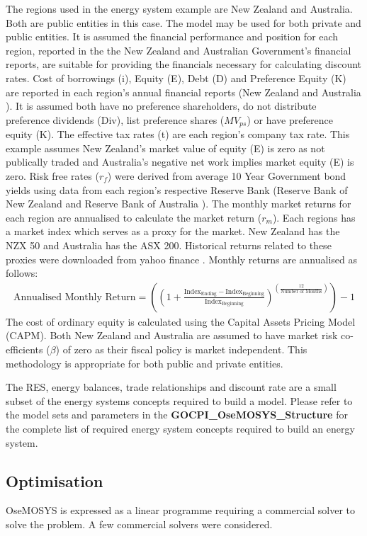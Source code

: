 \documentclass[12pt]{article}
\begin{document}
The regions used in the energy system example are New Zealand and Australia. 
Both are public entities in this case.
The model may be used for both private and public entities.
It is assumed the financial performance and position for each region, reported in the the New Zealand and Australian Government's financial reports, are suitable for providing the financials necessary for calculating discount rates.
Cost of borrowings (i), Equity (E),  Debt (D) and Preference Equity (K) 
are reported in each region's annual financial reports (New Zealand \cite{TNZ_FR} and Australia \cite{AG_FR}).
It is assumed both have no preference shareholders, do not distribute preference dividends (Div), list preference shares ($MV_{ps}$) or have preference equity (K).
The effective tax rates (t) are each region's company tax rate. 
This example assumes New Zealand's market value of equity (E) is zero as not publically traded and Australia's negative net work implies market equity (E) is zero.
Risk free rates ($r_f$) were derived from average 10 Year Government bond yields using data from each region's respective 
Reserve Bank (Reserve Bank of New Zealand \cite{RBNZ_WIR} and Reserve Bank of Australia \cite{RBA_ZCL}). 
The monthly market returns for each region are annualised to calculate the market return ($r_m$). 
Each regions has a market index which serves as a proxy for the market. 
New Zealand has the NZX 50 and Australia has the ASX 200. Historical returns related to these proxies were downloaded from yahoo finance \cite{ASX_NZ}.
Monthly returns are annualised as follows: 
\begin{align}
	\text{Annualised Monthly Return} = ((1 + \frac{\text{Index}_{\text{Ending}}-\text{Index}_{\text{Beginning}}}{\text{Index}_{\text{Beginning}}})^{(\frac{12}{\text{Number of Months}})})-1
\end{align}
The cost of ordinary equity is calculated using the Capital Assets Pricing Model (CAPM). 
Both New Zealand and Australia are assumed to have market risk co-efficients ($\beta$) of zero as their fiscal policy is market independent.
This methodology is appropriate for both public and private entities.

The RES, energy balances, trade relationships and discount rate are a small subset of the energy systems concepts required to build a model.
Please refer to the model sets and parameters in the \textbf{GOCPI\_OseMOSYS\_Structure} for the complete list of required energy system concepts required to build an energy system.

\subsection{Optimisation}
OseMOSYS is expressed as a linear programme requiring a commercial solver to solve the problem.
A few commercial solvers were considered.
\end{document}
